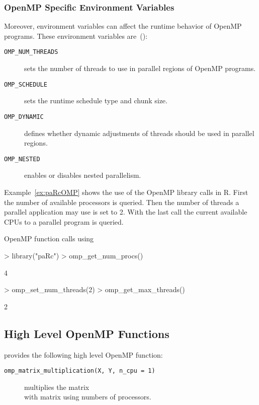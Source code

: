 \subsubsection{OpenMP Specific Environment Variables}

Moreover, environment variables can affect the runtime behavior of
OpenMP programs. These environment variables are~(\cite{openMP05}):

\begin{description}
\item[\texttt{OMP\_NUM\_THREADS}] sets the number of threads to use in
  parallel regions of OpenMP programs. 
\item[\texttt{OMP\_SCHEDULE}] sets the runtime schedule type and
  chunk size.
\item[\texttt{OMP\_DYNAMIC}] defines whether dynamic adjustments of threads
  should be used in parallel regions.
\item[\texttt{OMP\_NESTED}] enables or disables nested parallelism.
\end{description}

Example~\ref{ex:paRcOMP} shows the use of the OpenMP library calls in
R. First the number of available processors is queried. Then the
number of threads a parallel application may use is set to 2. With the
last call the current available CPUs to a parallel program is queried.
\begin{Example} OpenMP function calls using 
\label{ex:paRcOMP}
\begin{Schunk}
\begin{Sinput}
> library("paRc")
> omp_get_num_procs()
\end{Sinput}
\begin{Soutput}
[1] 4
\end{Soutput}
\begin{Sinput}
> omp_set_num_threads(2)
> omp_get_max_threads()
\end{Sinput}
\begin{Soutput}
[1] 2
\end{Soutput}
\end{Schunk}
\end{Example}

\subsection{High Level OpenMP Functions}

 provides the following high level OpenMP function: 

\begin{description}
\item[\texttt{omp\_matrix\_multiplication(X, Y, n\_cpu = 1)}] multiplies the matrix
   \\with matrix  using  numbers of
  processors.
\end{description}

